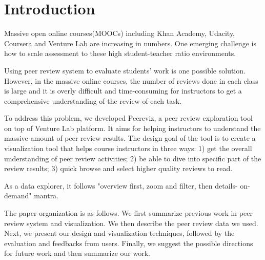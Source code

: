 \documentclass{sigchi}
\begin{document}


\section{Introduction}
Massive open online courses(MOOCs) including Khan Academy, Udacity, Coursera and
Venture Lab are increasing in numbers. \cite{nytimes} One emerging challenge is
how to scale assessment to these high student-teacher ratio environments.

Using peer review system \cite{cpr} to evaluate students’ work is one possible solution.
However, in the massive online courses,
the number of reviews done in each class is large and it is overly difficult
and time-consuming for instructors to get a comprehensive understanding
of the review of each task.

To address this problem, we developed Peereviz, a peer review exploration tool
on top of Venture Lab platform. It aims for helping instructors to understand
the massive amount of peer review results. The design goal of the tool is to
create a visualization tool that helps course instructors in three ways:
1) get the overall understanding of peer review activities;
2) be able to dive into specific part of the review results;
3) quick browse and select higher quality reviews to read.

As a data explorer, it follows "overview first, zoom and filter, then details-
on-demand" mantra. \cite{overviewfirst}


The paper organization is as follows.
We first summarize previous work in peer review system and visualization.
We then describe the peer review data we used.
Next, we present our design and visualization techniques,
followed by the evaluation and feedbacks from users.
Finally, we suggest the possible directions for future work
and then summarize our work.
\end{document}
